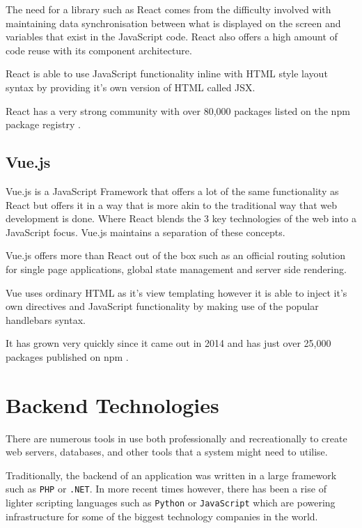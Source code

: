 The need for a library such as React comes from the difficulty involved with maintaining data synchronisation between what is displayed on the screen and variables that exist in the JavaScript code. React also offers a high amount of code reuse with its component architecture. 

React is able to use JavaScript functionality inline with HTML style layout syntax by providing it's own version of HTML called JSX.

React has a very strong community with over 80,000 packages listed on the npm package registry \cite{npm-search-react}.

\subsection{Vue.js}

Vue.js is a JavaScript Framework that offers a lot of the same functionality as React but offers it in a way that is more akin to the traditional way that web development is done. Where React blends the 3 key technologies of the web into a JavaScript focus. Vue.js maintains a separation of these concepts.

Vue.js offers more than React out of the box such as an official routing solution for single page applications, global state management and server side rendering.

Vue uses ordinary HTML as it's view templating however it is able to inject it's own directives and JavaScript functionality by making use of the popular handlebars syntax.

It has grown very quickly since it came out in 2014 and has just over 25,000 packages published on npm \cite{npm-search-vue}.

\section{Backend Technologies} \label{lit-backend}

There are numerous tools in use both professionally and recreationally to create web servers, databases, and other tools that a system might need to utilise. 

Traditionally, the backend of an application was written in a large framework such as \texttt{PHP} or \texttt{.NET}. In more recent times however, there has been a rise of lighter scripting languages such as \texttt{Python} or \texttt{JavaScript} which are powering infrastructure for some of the biggest technology companies in the world.

